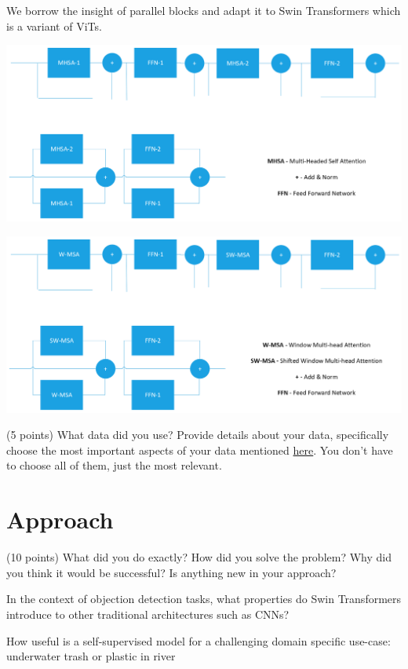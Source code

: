 \documentclass[10pt,twocolumn,letterpaper]{article}
\begin{document}
We borrow the insight of parallel blocks and adapt it to Swin Transformers\cite{liu2021swin} which is a variant of ViTs.

\includegraphics[width=0.8\linewidth]{docs/latex/images/MHSA-Original.png}
\caption{}

\includegraphics[width=0.8\linewidth]{docs/latex/images/MSA-Swin.png}
\caption{}



(5 points) What data did you use? Provide details about your data, specifically choose the most important aspects of your data mentioned \href{https://arxiv.org/abs/1803.09010}{here}. You don’t have to choose all of them, just the most relevant.


\section{Approach}

(10 points) What did you do exactly? How did you solve the problem? Why did you think it would be successful? Is anything new in your approach?

In the context of objection detection tasks, what properties do Swin Transformers introduce to other traditional architectures such as CNNs?


How useful is a self-supervised model for a challenging domain specific use-case: underwater trash or plastic in river
\end{document}
